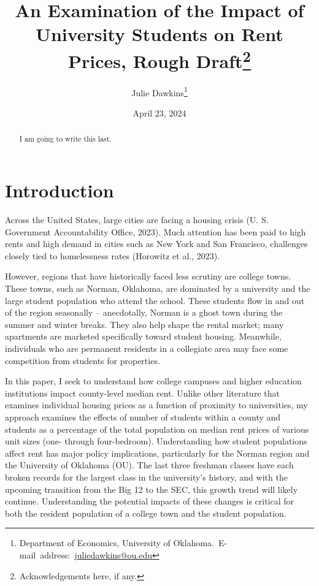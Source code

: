 \documentclass[12pt,english]{article}
\begin{document}
\begin{singlespace}
\title{An Examination of the Impact of University Students on Rent Prices, Rough Draft\thanks{Acknowledgements here, if any.}}
\end{singlespace}

\author{Julie Dawkins\thanks{Department of Economics, University of Oklahoma.\
E-mail~address:~\href{mailto:juliedawkins@ou.edu}{juliedawkins@ou.edu}}}

\date{April 23, 2024}

\maketitle

\begin{abstract}
\begin{singlespace}
I am going to write this last.
\end{singlespace}

\end{abstract}
\vfill{}


\pagebreak{}


\section{Introduction}\label{sec:intro}
Across the United States, large cities are facing a housing crisis (U. S. Government Accountability Office, 2023). Much attention has been paid to high rents and high demand in cities such as New York and San Francisco, challenges closely tied to homelessness rates (Horowitz et al., 2023).

However, regions that have historically faced less scrutiny are college towns. These towns, such as Norman, Oklahoma, are dominated by a university and the large student population who attend the school. These students flow in and out of the region seasonally – anecdotally, Norman is a ghost town during the summer and winter breaks. They also help shape the rental market; many apartments are marketed specifically toward student housing. Meanwhile, individuals who are permanent residents in a collegiate area may face some competition from students for properties.

In this paper, I seek to understand how college campuses and higher education institutions impact county-level median rent. Unlike other literature that examines individual housing prices as a function of proximity to universities, my approach examines the effects of number of students within a county and students as a percentage of the total population on median rent prices of various unit sizes (one- through four-bedroom). Understanding how student populations affect rent has major policy implications, particularly for the Norman region and the University of Oklahoma (OU). The last three freshman classes have each broken records for the largest class in the university’s history, and with the upcoming transition from the Big 12 to the SEC, this growth trend will likely continue. Understanding the potential impacts of these changes is critical for both the resident population of a college town and the student population. 
\end{document}

